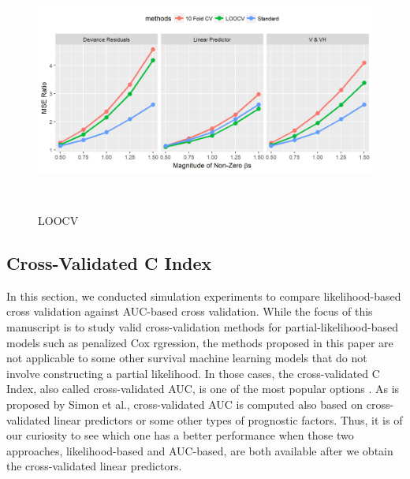
\begin{figure}[h]
    \centering
		\includegraphics[height= 8cm ]{./figures/figure_4.png}
    \caption{LOOCV}
\end{figure}	


 \subsection {Cross-Validated C Index}
\par In this section, we conducted simulation experiments to compare likelihood-based cross validation against AUC-based cross validation. While the focus of this manuscript is to study valid cross-validation methods for partial-likelihood-based models such as penalized Cox rgression, the methods proposed in this paper are not applicable to some other survival machine learning models that do not involve constructing a partial likelihood. In those cases, the cross-validated C Index, also called cross-validated AUC, is one of the most popular options \citep{Subramanian2011} \citep{Simon2011a}. As is proposed by Simon et al., cross-validated AUC is computed also based on cross-validated linear predictors or some other types of prognostic factors. Thus, it is of our curiosity to see which one has a better performance when those two approaches, likelihood-based and AUC-based, are both available after we obtain the cross-validated linear predictors.

